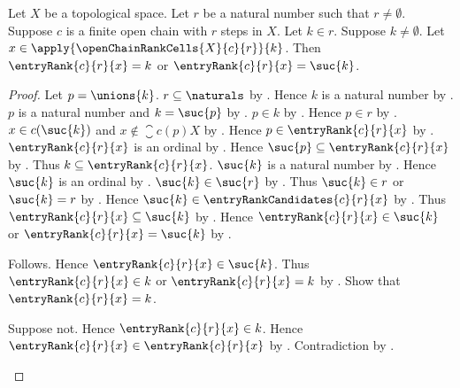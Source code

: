 \begin{proposition}\label{open_chain_entry_rank_on_interior_cell}
    Let $X$ be a topological space.
    Let $r$ be a natural number such that $r\neq\emptyset$.
    Suppose $c$ is a finite open chain with $r$ steps in $X$.
    Let $k\in r$.
    Suppose $k\neq\emptyset$.
    Let $x\in\apply{\openChainRankCells{X}{c}{r}}{k}$.
    Then $\entryRank{c}{r}{x}=k$ or
        $\entryRank{c}{r}{x}=\suc{k}$.
\end{proposition}
\begin{proof}
    Let $p=\unions{k}$.
    $r\subseteq\naturals$
        by .
    Hence $k$ is a natural number by .
    $p$ is a natural number and $k=\suc{p}$
        by .
    $p\in k$ by .
    Hence $p\in r$
        by
        .
    $x\in c(\suc{k})$ and
        $x\notin\closure{c(p)}{X}$
        by
        .
    Hence $p\in\entryRank{c}{r}{x}$
        by .
    $\entryRank{c}{r}{x}$ is an ordinal
        by .
    Hence $\suc{p}\subseteq\entryRank{c}{r}{x}$
        by .
    Thus $k\subseteq\entryRank{c}{r}{x}$.
    $\suc{k}$ is a natural number by .
    Hence $\suc{k}$ is an ordinal by .
    $\suc{k}\in\suc{r}$
        by .
    Thus $\suc{k}\in r$ or $\suc{k}=r$ by .
    Hence $\suc{k}\in\entryRankCandidates{c}{r}{x}$
        by .
    Thus $\entryRank{c}{r}{x}\subseteq\suc{k}$
        by .
    Hence $\entryRank{c}{r}{x}\in\suc{k}$ or
        $\entryRank{c}{r}{x}=\suc{k}$
        by .
    \begin{byCase}
            Follows.
            Hence $\entryRank{c}{r}{x}\in\suc{k}$.
            Thus $\entryRank{c}{r}{x}\in k$ or
                $\entryRank{c}{r}{x}=k$ by .
            Show that $\entryRank{c}{r}{x}=k$.
            \begin{subproof}
                Suppose not.
                Hence $\entryRank{c}{r}{x}\in k$.
                Hence $\entryRank{c}{r}{x}
                    \in\entryRank{c}{r}{x}$
                    by .
                Contradiction by .
            \end{subproof}
    \end{byCase}
\end{proof}

